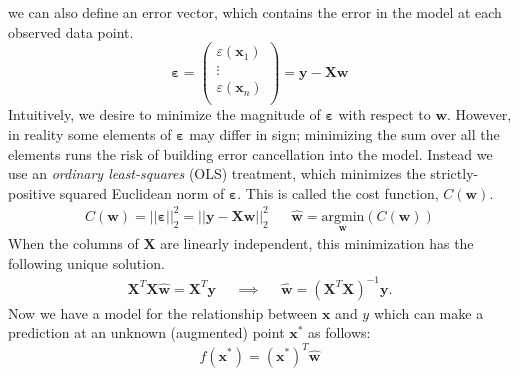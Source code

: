 \documentclass[11pt]{article}
\begin{document}
we can also define an error vector, which contains the error in the model at
each observed data point.
\begin{equation} 
	\boldsymbol{\varepsilon} 
= 
	\begin{pmatrix}
	\varepsilon(\mathbf{x}_1) \\ \vdots \\ \varepsilon(\mathbf{x}_n) \\
	\end{pmatrix} = \mathbf{y} - \mathbf{X} \mathbf{w} 
\end{equation} 
Intuitively, we desire to minimize the magnitude of $\boldsymbol{\varepsilon}$
with respect to $\mathbf{w}$.
However, in reality some elements of $\boldsymbol{\varepsilon}$ may differ in
sign; minimizing the sum over all the elements runs the risk of building error
cancellation into the model.  
Instead we use an {\it ordinary least-squares} (OLS) treatment, which minimizes
the strictly-positive squared Euclidean norm of $\boldsymbol{\varepsilon}$.
This is called the cost function, $C(\mathbf{w})$.  
\begin{align} 
	C(\mathbf{w})
= 
	||
		\boldsymbol{\varepsilon} 
	||_2^2 
= 
	|| 
		\mathbf{y} 
	- 
		\mathbf{X} 
		\mathbf{w} 
	||_2^2
&& 
	\hat{\mathbf{w}} 
= 
	\underset{
		\mathbf{w}
			}
			{
				\mathrm{argmin}
			}
	(C(\mathbf{w}))
\end{align} 
When the columns of $\mathbf{X}$ are linearly independent, this
minimization has the following unique solution. 
\begin{align}
\label{eq:ols-solution} 
\mathbf{X}^T \mathbf{X} \hat{\mathbf{w}} = \mathbf{X}^T
\mathbf{y} && \implies && \hat{\mathbf{w}} = \left( \mathbf{X}^T \mathbf{X}
\right)^{-1} \mathbf{y}.  
\end{align} 
Now we have a model for the relationship between $\mathbf{x}$ and $y$ which can
make a prediction at an unknown (augmented) point $\mathbf{x}^*$ as follows:
\begin{equation} 
	f(\mathbf{x}^*) 
=
	(\mathbf{x}^*)^T 
	\mathbf{\hat{w}} 
\end{equation} 
\newpage
\end{document}
